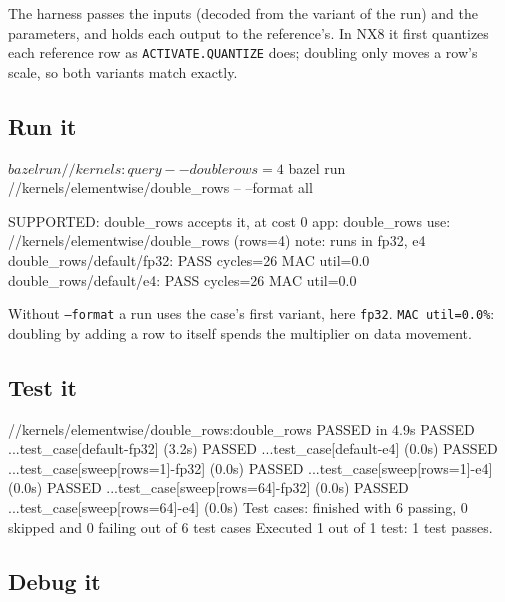 \documentclass[11pt,a4paper]{article}
\begin{document}
The harness passes the inputs (decoded from the variant of the run) and the
parameters, and holds each output to the reference's. In NX8 it first
quantizes each reference row as \texttt{ACTIVATE.QUANTIZE} does; doubling only
moves a row's scale, so both variants match exactly.

\needspace{0.42\textheight}
\subsection{Run it}

\begin{termcmd}
$ bazel run //kernels:query -- double rows=4
$ bazel run //kernels/elementwise/double_rows -- --format all
\end{termcmd}
\begin{termout}
SUPPORTED: double_rows accepts it, at cost 0
  app:  double_rows
  use:  //kernels/elementwise/double_rows (rows=4)
  note: runs in fp32, e4
double_rows/default/fp32: PASS  cycles=26  MAC util=0.0%
double_rows/default/e4: PASS  cycles=26  MAC util=0.0%
\end{termout}

Without \texttt{--format} a run uses the case's first variant, here
\texttt{fp32}. \texttt{MAC util=0.0\%}: doubling by adding a row to itself
spends the multiplier on data movement.

\needspace{0.3\textheight}
\subsection{Test it}

\begin{termout}
//kernels/elementwise/double_rows:double_rows                           PASSED in 4.9s
    PASSED  ...test_case[default-fp32] (3.2s)
    PASSED  ...test_case[default-e4] (0.0s)
    PASSED  ...test_case[sweep[rows=1]-fp32] (0.0s)
    PASSED  ...test_case[sweep[rows=1]-e4] (0.0s)
    PASSED  ...test_case[sweep[rows=64]-fp32] (0.0s)
    PASSED  ...test_case[sweep[rows=64]-e4] (0.0s)
Test cases: finished with 6 passing, 0 skipped and 0 failing out of 6 test cases
Executed 1 out of 1 test: 1 test passes.
\end{termout}

\needspace{0.2\textheight}
\subsection{Debug it}
\end{document}
